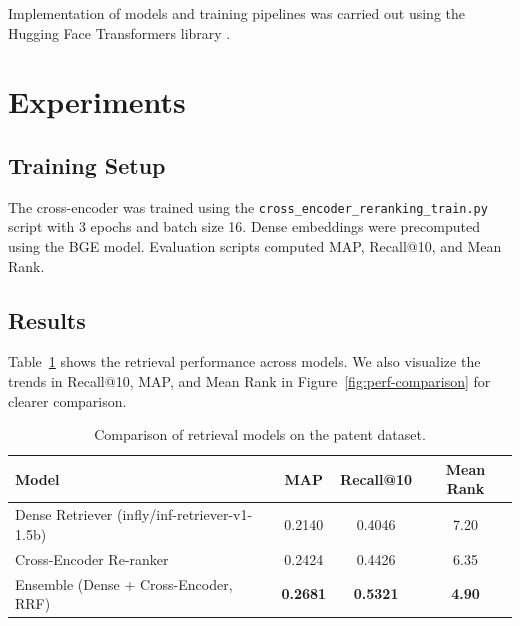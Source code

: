 \documentclass[11pt,a4paper]{article}
\begin{document}
Implementation of models and training pipelines was carried out using the Hugging Face Transformers library \cite{wolf2020transformers}.

\section{Experiments}
\subsection{Training Setup}
The cross-encoder was trained using the \texttt{cross\_encoder\_reranking\_train.py} script with 3 epochs and batch size 16. Dense embeddings were precomputed using the BGE model. Evaluation scripts computed MAP, Recall@10, and Mean Rank.

\subsection{Results}
Table~\ref{tab:results} shows the retrieval performance across models. 
We also visualize the trends in Recall@10, MAP, and Mean Rank in Figure~\ref{fig:perf-comparison} 
for clearer comparison.

\begin{table}[H]
\centering
\begin{tabular}{lccc}
\toprule
\textbf{Model} & \textbf{MAP} & \textbf{Recall@10} & \textbf{Mean Rank} \\
\midrule
Dense Retriever (infly/inf-retriever-v1-1.5b) & 0.2140 & 0.4046 & 7.20 \\
Cross-Encoder Re-ranker & 0.2424 & 0.4426 & 6.35 \\
Ensemble (Dense + Cross-Encoder, RRF) & \textbf{0.2681} & \textbf{0.5321} & \textbf{4.90} \\
\bottomrule
\end{tabular}
\caption{Comparison of retrieval models on the patent dataset.}
\label{tab:results}
\end{table}

\FloatBarrier
\end{document}
